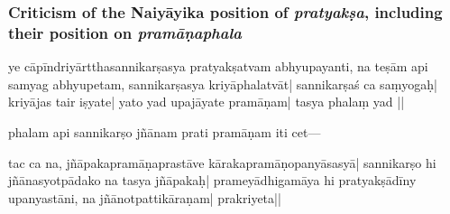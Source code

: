 \subsubsection{Criticism of the Naiyāyika position of \emph{pratyakṣa}, including their position on \emph{pramāṇaphala}}
ye cāpīndriyārtthasannika\mds rṣasya pratyakṣatvam abhyupayanti, 
na teṣām api samyag abhyupetam, sannikarṣasya kriyāphalatvāt|
sannikarṣa\mde ś ca saṃyogaḥ| 
 kriyājas tair iṣyate| 
yato yad upajā\mds yate  pramāṇam|  tasya phalaṃ yad ||

phalam api \mds sannikarṣo jñānam prati pramāṇam iti cet---

tac ca na, jñ\mde āpakapra\mds māṇa\mde pra\mds stāve kārakapramā\mde ṇopanyāsasyā| sannikarṣo hi jñānasyotpāda\mds ko \mde na tasya jñāpakaḥ| 
prameyādhigamāya hi pra\-tyakṣādīny upa\mds nyastāni, na jñānotpattikāraṇam|  %
prakriyeta||

